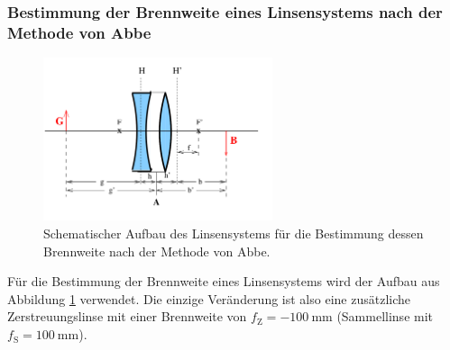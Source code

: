 \subsubsection{Bestimmung der Brennweite eines Linsensystems nach der Methode von Abbe}
\label{sec:abbe}
\begin{figure}
  \centering
  \includegraphics[width=0.6\textwidth]{Bilder/Linselol.png}
  \caption{Schematischer Aufbau des Linsensystems für die Bestimmung dessen Brennweite nach der Methode von Abbe.}
  \label{fig:lensesystemlol}
\end{figure}
Für die Bestimmung der Brennweite eines Linsensystems wird der Aufbau aus Abbildung
\ref{fig:lensesystemlol} verwendet.
Die einzige Veränderung ist also eine zusätzliche Zerstreuungslinse mit einer Brennweite von
$f_{\mathrm{Z}} = -\SI{100}{\milli\meter}$ (Sammellinse mit $f_{\mathrm{S}}=\SI{100}{\milli\meter}$).
